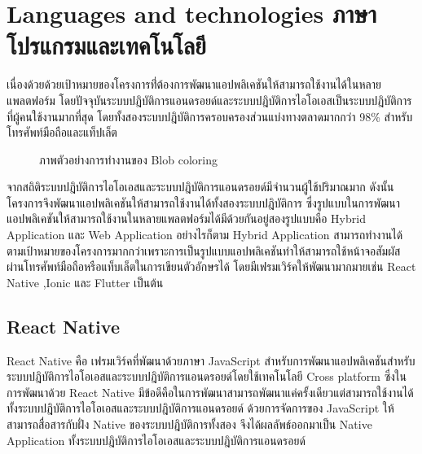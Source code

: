 \documentclass[12pt,oneside,openright,a4paper]{cpe-thai-project}
\begin{document}
\section{Languages and technologies  ภาษาโปรแกรมและเทคโนโลยี}
เนื่องด้วยด้วยเป้าหมายของโครงการที่่ต้องการพัฒนาแอปพลิเคชันให้สามารถใช้งานได้ในหลายแพลตฟอร์ม 
โดยปัจจุบันระบบปฎิบัติการแอนดรอยด์และระบบปฎิบัติการไอโอเอสเป็นระบบปฎิบัติการที่ผู้คนใช้งานมากที่สุด 
โดยทั้งสองระบบปฎิบัติการครอบครองส่วนแบ่งทางตลาดมากกว่า 98\%  สำหรับโทรศัพท์มือถือและแท็ปเล็ต
\begin{figure}[!ht]\centering
  \setlength{\fboxrule}{0.2mm} %
  \setlength{\fboxsep}{1cm}
  \caption{ภาพตัวอย่างการทำงานของ Blob coloring}\label{fig:blob}
\end{figure}
จากสถิติระบบปฎิบัติการไอโอเอสและระบบปฎิบัติการแอนดรอยด์มีจำนวนผู้ใช้ปริมาณมาก ดังนั้นโครงการจึงพัฒนาแอปพลิเคชันให้สามารถใช้งานได้ทั้งสองระบบปฎิบัติการ 
ซึ่งรูปแบบในการพัฒนาแอปพลิเคชันให้สามารถใช้งานในหลายแพลตฟอร์มได้มีด้วยกันอยู่สองรูปแบบคือ Hybrid Application และ Web Application อย่างไรก็ตาม Hybrid Application 
สามารถทำงานได้ตามเป้าหมายของโครงการมากกว่าเพราะการเป็นรูปแบบแอปพลิเคชันทำให้สามารถใช้หน้าจอสัมผัสผ่านโทรศัพท์มือถือหรือแท็บเล็ตในการเขียนตัวอักษรได้ โดยมีเฟรมเวิร์คให้พัฒนามากมายเช่น React Native ,Ionic และ Flutter เป็นต้น


\subsection{React Native}
React Native คือ เฟรมเวิร์คที่พัฒนาด้วยภาษา JavaScript สำหรับการพัฒนาแอปพลิเคชันสำหรับระบบปฎิบัติการไอโอเอสและระบบปฎิบัติการแอนดรอยด์โดยใช้เทคโนโลยี 
Cross platform ซึ่งในการพัฒนาด้วย React Native มีข้อดีคือในการพัฒนาสามารถพัฒนาแค่ครั้งเดียวแต่สามารถใช้งานได้ทั้งระบบปฎิบัติการไอโอเอสและระบบปฎิบัติการแอนดรอยด์ 
ด้วยการจัดการของ JavaScript ให้สามารถสื่อสารกับฝั่ง Native ของระบบปฎิบัติการทั้งสอง จึงได้ผลลัพธ์ออกมาเป็น Native Application ทั้งระบบปฎิบัติการไอโอเอสและระบบปฎิบัติการแอนดรอยด์ 
\end{document}
